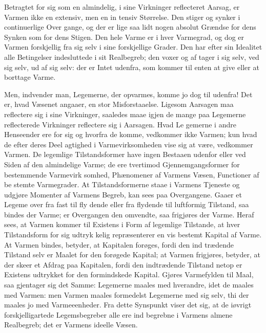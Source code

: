 \documentclass[12pt,a4paper]{book}
\begin{document}
Betragtet for sig som en almindelig, i sine Virkninger reflecteret
Aarsag, er Varmen ikke en extensiv, men en in\-%
tensiv Størrelse. Den stiger og synker i continuerlige Over\-%
gange, og der er lige saa lidt nogen absolut Grændse for dens Synken
som for dens Stigen. Den hele Varme er i hver Varmegrad, og dog er
Varmen forskjellig fra sig selv i sine forskjellige Grader. Den har
efter sin Idealitet alle Betingelser indesluttede i sit Realbegreb; den
voxer og af\-%
tager i sig selv, ved sig selv, ud af sig selv: der er Intet udenfra,
som kommer til enten at give eller at borttage Varme.

Men, indvender man, Legemerne, der opvarmes, komme jo dog til udenfra!
Det er, hvad Væsenet angaaer, en stor Misforstaaelse. Ligesom Aarsagen
maa reflectere sig i sine Virkninger, saaledes maae igjen de mange paa
Legemerne reflecterede Virkninger reflectere sig i Aarsagen. Hvad
Le\-%
gemerne i andre Henseender ere for sig og hvorfra de komme, vedkommer
ikke Varmen; kun hvad de efter deres Deel\-%
agtighed i Varmevirksomheden vise sig at være, vedkommer Varmen. De
legemlige Tilstandsformer have ingen Bestaaen udenfor eller ved Siden
af den almindelige Varme; de ere tvertimod Gjennemgangsformer for
bestemmende Varmevirk\-%
somhed, Phænomener af Varmens Væsen, Functioner af be\-%
stemte Varmegrader. At Tilstandsformerne staae i Varmens Tjeneste og
udgjøre Momenter af Varmens Begreb, kan sees paa Overgangene. Gaaer et
Legeme over fra fast til fly\-%
dende eller fra flydende til luftformig Tilstand, saa bindes der Varme;
er Overgangen den omvendte, saa frigjøres der Varme. Heraf sees, at
Varmen kommer til Existens i Form af legemlige Tilstande, at hver
Tilstandsform for sig udtryk\-%
kelig repræsenterer en vis bestemt Kapital af Varme. At Varmen bindes,
betyder, at Kapitalen forøges, fordi den ind\-%
trædende Tilstand selv er Maalet for den forøgede Kapital; at Varmen
frigjøres, betyder, at der skeer et Afdrag paa Kapitalen, fordi den
indtrædende Tilstand netop er Existens\-%
udtrykket for den formindskede Kapital. Gjøres Varmefylden til Maal,
saa gjentager sig det Samme: Legemerne maales med hverandre, idet de
maales med Varmen: men Varmen maales formedelst Legemerne med sig selv,
thi der maales jo med Varmeeenheder. Fra dette Synspunkt viser det sig,
at de iøvrigt forskjelligartede Legemsbegreber alle ere ind\-%
begrebne i Varmens almene Realbegreb; det er Varmens ideelle Væsen.
\end{document}
